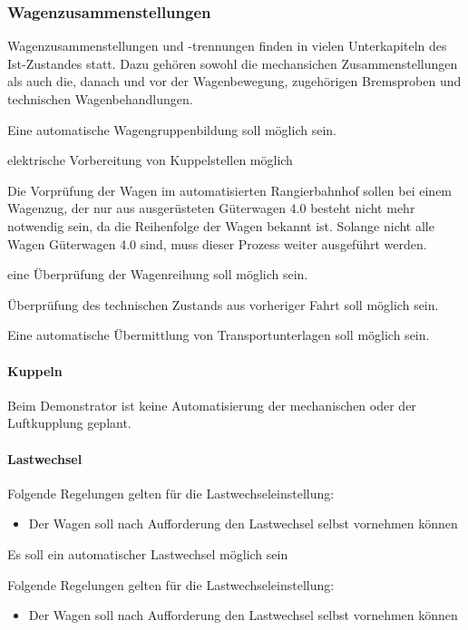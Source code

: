 \subsubsection{Wagenzusammenstellungen}
Wagenzusammenstellungen und -trennungen finden in vielen Unterkapiteln des Ist-Zustandes statt. Dazu gehören sowohl die mechansichen Zusammenstellungen als auch die, danach und vor der Wagenbewegung, zugehörigen Bremsproben und technischen Wagenbehandlungen.
\begin{feat}
Eine automatische Wagengruppenbildung soll möglich sein.
\end{feat}
\begin{feat}
elektrische Vorbereitung von Kuppelstellen möglich
\end{feat}
Die Vorprüfung der Wagen im automatisierten Rangierbahnhof sollen bei einem Wagenzug, der nur aus ausgerüsteten Güterwagen 4.0 besteht nicht mehr notwendig sein, da die Reihenfolge der Wagen bekannt ist. Solange nicht alle Wagen Güterwagen 4.0 sind, muss dieser Prozess weiter ausgeführt werden.
\begin{feat}
eine Überprüfung der Wagenreihung soll möglich sein.
\end{feat}
\begin{feat}
Überprüfung des technischen Zustands aus vorheriger Fahrt soll möglich sein.
\end{feat}
\begin{feat}
Eine automatische Übermittlung von Transportunterlagen soll möglich sein.
\end{feat}

\paragraph{Kuppeln}\par
Beim Demonstrator ist keine Automatisierung der mechanischen oder der Luftkupplung geplant.

\paragraph{Lastwechsel}\par
Folgende Regelungen gelten für die Lastwechseleinstellung:
\begin{itemize}
    \item Der Wagen soll nach Aufforderung den Lastwechsel selbst vornehmen können
\end{itemize}
\begin{feat}
Es soll ein automatischer Lastwechsel möglich sein
\end{feat}
\begin{rem}
Folgende Regelungen gelten für die Lastwechseleinstellung:
\begin{itemize}
    \item Der Wagen soll nach Aufforderung den Lastwechsel selbst vornehmen können
\end{itemize}
\end{rem}

